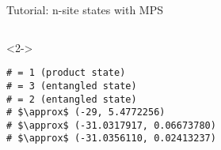 \begin{frame}[fragile]{Tutorial: n-site states with MPS}
\begin{columns}
\begin{column}{5.5cm}
\begin{onlyenv}<2->

\begin{lstlisting}[style=julia, numbers=none, mathescape, basicstyle=\small]
# = 1 (product state)
# = 3 (entangled state)
# = 2 (entangled state)
# $\approx$ (-29, 5.4772256)
# $\approx$ (-31.0317917, 0.06673780)
# $\approx$ (-31.0356110, 0.02413237)
\end{lstlisting}

\end{onlyenv}

\end{column}

\end{columns}

\end{frame}
